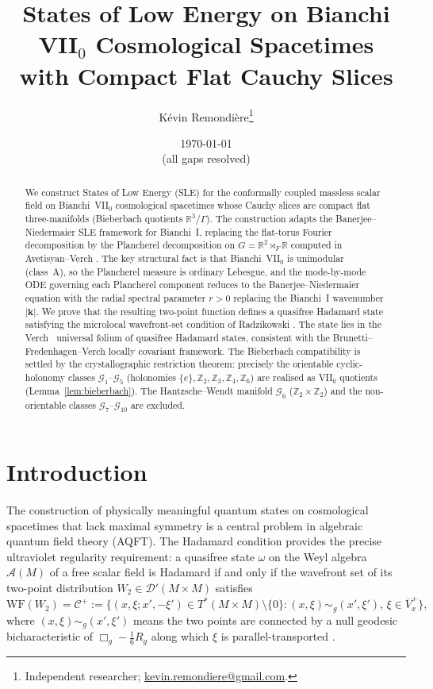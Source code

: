 \documentclass[12pt, a4paper]{article}
\title{States of Low Energy on Bianchi VII$_0$ Cosmological Spacetimes\\
  with Compact Flat Cauchy Slices}
\author{Kévin Remondière\thanks{Independent researcher; \href{mailto:kevin.remondiere@gmail.com}{kevin.remondiere@gmail.com}.}}
\date{\today\\\small (all gaps resolved)}
\theoremstyle{remark}
\newcommand{\bR}{\mathbb{R}}
\newcommand{\bZ}{\mathbb{Z}}
\newcommand{\cA}{\mathcal{A}}
\newcommand{\WF}{\mathrm{WF}}
\newcommand{\semidp}{\rtimes}
\begin{document}
\maketitle

\begin{abstract}
We construct States of Low Energy (SLE) for the conformally coupled massless
scalar field on Bianchi~VII$_0$ cosmological spacetimes whose Cauchy slices
are compact flat three-manifolds (Bieberbach quotients $\bR^3/\Gamma$).
The construction adapts the Banerjee--Niedermaier \cite{BN23} SLE framework
for Bianchi~I, replacing the flat-torus Fourier decomposition by the
Plancherel decomposition on $G = \bR^2 \semidp_F \bR$ computed in
Avetisyan--Verch \cite{AV13}.
The key structural fact is that Bianchi~VII$_0$ is unimodular (class~A),
so the Plancherel measure is ordinary Lebesgue, and the mode-by-mode ODE
governing each Plancherel component reduces to the Banerjee--Niedermaier
equation with the radial spectral parameter $r > 0$ replacing the
Bianchi~I wavenumber $|\mathbf{k}|$.
We prove that the resulting two-point function defines a quasifree Hadamard
state satisfying the microlocal wavefront-set condition of
Radzikowski \cite{Rad96}.
The state lies in the Verch~\cite{Ver94} universal folium of quasifree
Hadamard states, consistent with the Brunetti--Fredenhagen--Verch \cite{BFV03}
locally covariant framework.
The Bieberbach compatibility is settled by the crystallographic restriction
theorem: precisely the orientable cyclic-holonomy classes
$\mathcal{G}_1$--$\mathcal{G}_5$ (holonomies $\{e\}, \bZ_2, \bZ_3, \bZ_4,
\bZ_6$) are realised as VII$_0$ quotients (Lemma~\ref{lem:bieberbach}).
The Hantzsche--Wendt manifold $\mathcal{G}_6$ ($\bZ_2\times\bZ_2$) and the
non-orientable classes $\mathcal{G}_7$--$\mathcal{G}_{10}$ are excluded.
\end{abstract}

\tableofcontents

\section{Introduction}

The construction of physically meaningful quantum states on cosmological
spacetimes that lack maximal symmetry is a central problem in algebraic
quantum field theory (AQFT).
The Hadamard condition \cite{Rad96} provides the precise ultraviolet
regularity requirement: a quasifree state $\omega$ on the Weyl algebra
$\cA(M)$ of a free scalar field is Hadamard if and only if the wavefront
set of its two-point distribution $W_2 \in \mathscr{D}'(M \times M)$
satisfies
\begin{equation}\label{eq:Rad}
  \WF(W_2) = \mathcal{C}^+ := \{(x, \xi; x', -\xi') \in T^*(M\times M)
    \setminus \{0\} : (x,\xi) \sim_g (x',\xi'),\, \xi \in \overline{V}^+_x \},
\end{equation}
where $(x,\xi) \sim_g (x',\xi')$ means the two points are connected by a
null geodesic bicharacteristic of $\Box_g - \tfrac{1}{6}R_g$ along which
$\xi$ is parallel-transported \cite{Rad96}.
\end{document}
